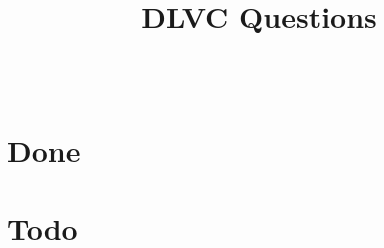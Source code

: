 \documentclass[11pt,a4paper]{article}
\title{DLVC Questions}
\author{ \authorname{Abraham Hinteregger} \\
}
\begin{document}
\maketitle
\listoftodos
\tableofcontents
\clearpage\part{Done}
\clearpage\part{Todo}
\end{document}

